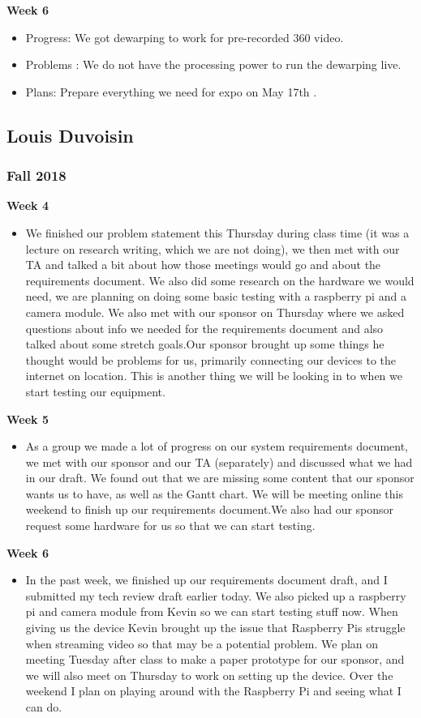\documentclass[onecolumn, draftclsnofoot,10pt, compsoc]{IEEEtran}
\begin{document}
\textbf{Week 6}
\begin{itemize}
    \item Progress: We got dewarping to work for pre-recorded 360 video.
    \item Problems : We do not have the processing power to run the dewarping live.
    \item Plans: Prepare everything we need for expo on May 17th . 
\end{itemize}

\subsection{Louis Duvoisin}
    \subsubsection{Fall 2018}
        \textbf{Week 4}
        \begin{itemize}
            \item We finished our problem statement this Thursday during class time (it was a lecture on research writing, which we are not doing), we then met with our TA and talked a bit about how those meetings would go and about the requirements document. We also did some research on the hardware we would need, we are planning on doing some basic testing with a raspberry pi and a camera module. We also met with our sponsor on Thursday where we asked questions about info we needed for the requirements document and also talked about some stretch goals.Our sponsor brought up some things he thought would be problems for us, primarily connecting our devices to the internet on location. This is another thing we will be looking in to when we start testing our equipment.
        \end{itemize}
         \textbf{Week 5}
        \begin{itemize}
            \item As a group we made a lot of progress on our system requirements document, we met with our sponsor and our TA (separately) and discussed what we had in our draft. We found out that we are missing some content that our sponsor wants us to have, as well as the Gantt chart. We will be meeting online this weekend to finish up our requirements document.We also had our sponsor request some hardware for us so that we can start testing.
        \end{itemize}
        \newpage
        \textbf{Week 6}
        \begin{itemize}
            \item In the past week, we finished up our requirements document draft, and I submitted my tech review draft earlier today. We also picked up a raspberry pi and camera module from Kevin so we can start testing stuff now. When giving us the device Kevin brought up the issue that Raspberry Pis struggle when streaming video so that may be a potential problem. We plan on meeting Tuesday after class to make a paper prototype for our sponsor, and we will also meet on Thursday to work on setting up the device. Over the weekend I plan on playing around with the Raspberry Pi and seeing what I can do.
        \end{itemize}
\end{document}
